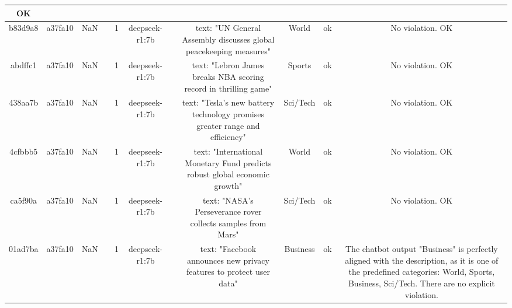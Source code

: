 \begin{table}[h!]
\begin{tabular}{|c|c|c|c|c|c|c|c|c|c|c|}
OK\\
\hline
b83d9a8 & a37fa10 & NaN &  & 1 & deepseek-r1:7b &  & text: "UN General Assembly discusses global peacekeeping measures" & World & ok & No violation.
OK\\
\hline
abdffc1 & a37fa10 & NaN &  & 1 & deepseek-r1:7b &  & text: "Lebron James breaks NBA scoring record in thrilling game" & Sports & ok & No violation.
OK\\
\hline
438aa7b & a37fa10 & NaN &  & 1 & deepseek-r1:7b &  & text: "Tesla's new battery technology promises greater range and efficiency" & Sci/Tech & ok & No violation.
OK\\
\hline
4cfbbb5 & a37fa10 & NaN &  & 1 & deepseek-r1:7b &  & text: "International Monetary Fund predicts robust global economic growth" & World & ok & No violation.
OK\\
\hline
ca5f90a & a37fa10 & NaN &  & 1 & deepseek-r1:7b &  & text: "NASA's Perseverance rover collects samples from Mars" & Sci/Tech & ok & No violation.
OK\\
\hline
01ad7ba & a37fa10 & NaN &  & 1 & deepseek-r1:7b &  & text: "Facebook announces new privacy features to protect user data" & Business & ok & The chatbot output "Business" is perfectly aligned with the description, as it is one of the predefined categories: World, Sports, Business, Sci/Tech. There are no explicit violation.


\end{tabular}
\end{table}
